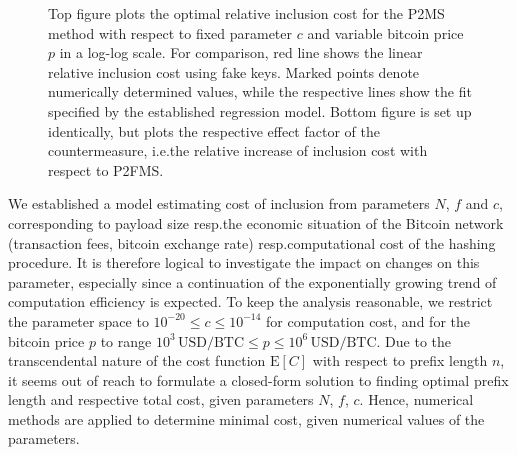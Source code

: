 \documentclass[a4paper,11pt,titlepage]{scrbook}
\begin{document}
\begin{figure}[p]
    \caption[Optimal relative inclusion cost with respect to arbitrary parameters $c$ and bitcoin price $p$]{Top figure plots the optimal relative inclusion cost for the P2MS method with respect to fixed parameter $c$ and variable bitcoin price $p$ in a log-log scale. For comparison, red line shows the linear relative inclusion cost using fake keys.
    Marked points denote numerically determined values, while the respective lines show the fit specified by the established regression model. Bottom figure is set up identically, but plots the respective effect factor of the countermeasure, i.e.\@ the relative increase of inclusion cost with respect to P2FMS.}
    \label{figure:fit}
\end{figure}

We established a model estimating cost of inclusion from parameters $N$, $f$ and $c$, corresponding to payload size resp.\@ the economic situation of the Bitcoin network (transaction fees, bitcoin exchange rate) resp.\@ computational cost of the hashing procedure.
It is therefore logical to investigate the impact on changes on this parameter, especially since a continuation of the exponentially growing trend of computation efficiency is expected.
To keep the analysis reasonable, we restrict the parameter space to $10^{-20} \leq c \leq 10^{-14}$ for computation cost, and for the bitcoin price $p$ to range $10^3\,\text{USD}/\text{BTC} \leq p \leq 10^6\,\text{USD}/\text{BTC}$.
Due to the transcendental nature of the cost function $\mathrm{E}[C]$ with respect to prefix length $n$, it seems out of reach to formulate a closed-form solution to finding optimal prefix length and respective total cost, given parameters $N$, $f$, $c$.
Hence, numerical methods are applied to determine minimal cost, given numerical values of the parameters.
\end{document}
